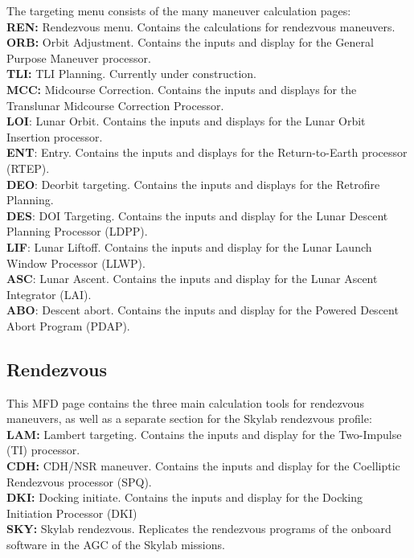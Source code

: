 \documentclass[11pt]{article} %
\begin{document}
The targeting menu consists of the many maneuver calculation pages:\\
\textbf{REN:} Rendezvous menu. Contains the calculations for rendezvous maneuvers.\\
\textbf{ORB:} Orbit Adjustment. Contains the inputs and display for the General Purpose Maneuver processor.\\
\textbf{TLI:} TLI Planning. Currently under construction.\\
\textbf{MCC:} Midcourse Correction. Contains the inputs and displays for the Translunar Midcourse Correction Processor.\\
\textbf{LOI}: Lunar Orbit. Contains the inputs and displays for the Lunar Orbit Insertion processor.\\
\textbf{ENT}: Entry. Contains the inputs and displays for the Return-to-Earth processor (RTEP).\\
\textbf{DEO}: Deorbit targeting. Contains the inputs and displays for the Retrofire Planning.\\
\textbf{DES}: DOI Targeting. Contains the inputs and display for the Lunar Descent Planning Processor (LDPP).\\
\textbf{LIF}: Lunar Liftoff. Contains the inputs and display for the Lunar Launch Window Processor (LLWP).\\
\textbf{ASC}: Lunar Ascent. Contains the inputs and display for the Lunar Ascent Integrator (LAI).\\
\textbf{ABO}: Descent abort. Contains the inputs and display for the Powered Descent Abort Program (PDAP).\\

\subsection{Rendezvous}

This MFD page contains the three main calculation tools for rendezvous maneuvers, as well as a separate section for the Skylab rendezvous profile:\\

\textbf{LAM:} Lambert targeting. Contains the inputs and display for the Two-Impulse (TI) processor.\\ 
\textbf{CDH:} CDH/NSR maneuver. Contains the inputs and display for the Coelliptic Rendezvous processor (SPQ).\\ 
\textbf{DKI:} Docking initiate. Contains the inputs and display for the Docking Initiation Processor (DKI)\\ 
\textbf{SKY:} Skylab rendezvous. Replicates the rendezvous programs of the onboard software in the AGC of the Skylab missions.\\ 
\end{document}
